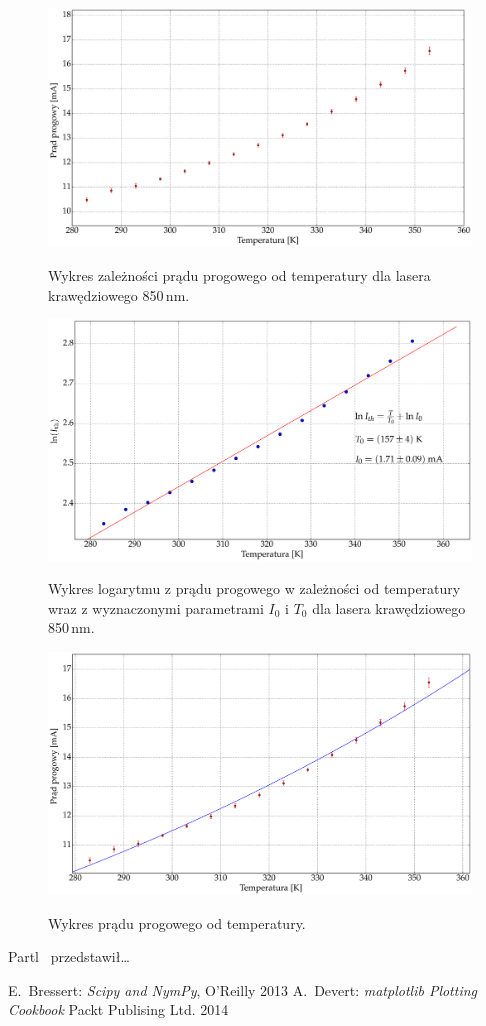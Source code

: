 \documentclass[a4paper, portrait,12pt]{mwrep}
\begin{document}
\begin{figure}
\center
  \includegraphics[scale=0.30]{plot850P010/plot_i_th_error.eps}
  \label{rys1}
  \caption{Wykres zależności prądu progowego od temperatury dla lasera krawędziowego 850\,nm.} 
\end{figure}\begin{figure}
\center
  \includegraphics[scale=0.30]{plot850P010/plot_fit.eps}
  \label{rys1}
  \caption{Wykres logarytmu z prądu progowego w zależności od temperatury wraz z wyznaczonymi parametrami $I_0$ i $T_0$ dla lasera krawędziowego 850\,nm.} 
  \includegraphics[scale=0.30]{plot850P010/plot_exp.eps}
  \label{rys1}
  \caption{Wykres prądu progowego od temperatury.} 
\end{figure}


Partl~\cite{matplotlib_book} przedstawi\l \ldots

\begin{thebibliography}{99}
 E.~Bressert:
\emph{Scipy and NymPy},
O'Reilly 2013
  A.~Devert:
\emph{matplotlib Plotting Cookbook}
Packt Publising Ltd. 2014
\end{thebibliography}
\end{document}
